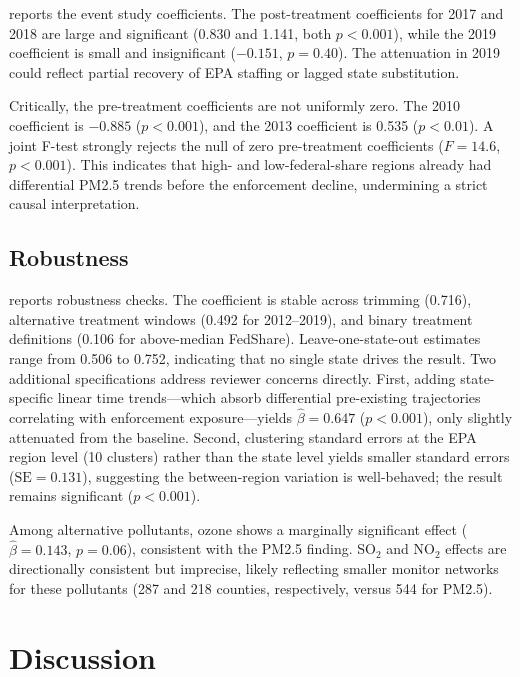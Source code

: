 \documentclass[12pt]{article}
\begin{document}
 reports the event study coefficients. The post-treatment coefficients for 2017 and 2018 are large and significant (0.830 and 1.141, both $p < 0.001$), while the 2019 coefficient is small and insignificant ($-0.151$, $p = 0.40$). The attenuation in 2019 could reflect partial recovery of EPA staffing or lagged state substitution.

Critically, the pre-treatment coefficients are not uniformly zero. The 2010 coefficient is $-0.885$ ($p < 0.001$), and the 2013 coefficient is 0.535 ($p < 0.01$). A joint F-test strongly rejects the null of zero pre-treatment coefficients ($F = 14.6$, $p < 0.001$). This indicates that high- and low-federal-share regions already had differential PM2.5 trends before the enforcement decline, undermining a strict causal interpretation.



\subsection{Robustness}

 reports robustness checks. The coefficient is stable across trimming (0.716), alternative treatment windows (0.492 for 2012--2019), and binary treatment definitions (0.106 for above-median FedShare). Leave-one-state-out estimates range from 0.506 to 0.752, indicating that no single state drives the result. Two additional specifications address reviewer concerns directly. First, adding state-specific linear time trends---which absorb differential pre-existing trajectories correlating with enforcement exposure---yields $\hat{\beta} = 0.647$ ($p < 0.001$), only slightly attenuated from the baseline. Second, clustering standard errors at the EPA region level (10 clusters) rather than the state level yields smaller standard errors ($\text{SE} = 0.131$), suggesting the between-region variation is well-behaved; the result remains significant ($p < 0.001$).

Among alternative pollutants, ozone shows a marginally significant effect ($\hat{\beta} = 0.143$, $p = 0.06$), consistent with the PM2.5 finding. SO$_2$ and NO$_2$ effects are directionally consistent but imprecise, likely reflecting smaller monitor networks for these pollutants (287 and 218 counties, respectively, versus 544 for PM2.5).



\section{Discussion}\label{sec:discussion}
\end{document}
